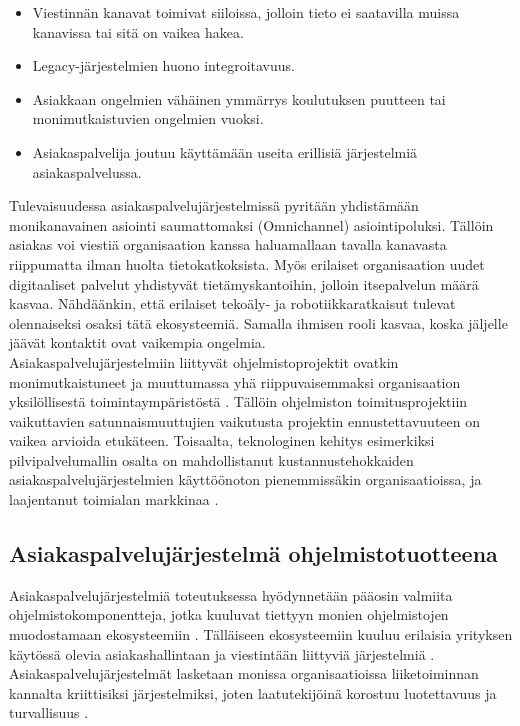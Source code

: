 \documentclass[finnish,12pt,a4paper,pdftex]{article}
\begin{document}
\begin{itemize}
\setlength{\itemsep}{0pt}
    \item Viestinnän kanavat toimivat siiloissa, jolloin tieto ei saatavilla muissa kanavissa tai sitä on vaikea hakea.
    \item Legacy-järjestelmien huono integroitavuus.
    \item Asiakkaan ongelmien vähäinen ymmärrys koulutuksen puutteen tai monimutkaistuvien ongelmien vuoksi.
    \item Asiakaspalvelija joutuu käyttämään useita erillisiä järjestelmiä asiakaspalvelussa. 
\end{itemize}

\noindent Tulevaisuudessa asiakaspalvelujärjestelmissä pyritään yhdistämään monikanavainen asiointi saumattomaksi (Omnichannel) asiointipoluksi. Tällöin asiakas voi viestiä organisaation kanssa haluamallaan tavalla kanavasta riippumatta ilman huolta tietokatkoksista. Myös erilaiset organisaation uudet digitaaliset palvelut yhdistyvät tietämyskantoihin, jolloin itsepalvelun määrä kasvaa. Nähdäänkin, että erilaiset tekoäly- ja robotiikkaratkaisut tulevat olennaiseksi osaksi tätä ekosysteemiä. Samalla ihmisen rooli kasvaa, koska jäljelle jäävät kontaktit ovat vaikempia ongelmia. \citep{ccgartner} \\

\noindent Asiakaspalvelujärjestelmiin liittyvät ohjelmistoprojektit ovatkin monimutkaistuneet ja muuttumassa yhä riippuvaisemmaksi organisaation yksilöllisestä toimintaympäristöstä \citep{ccinfo}. Tällöin ohjelmiston toimitusprojektiin vaikuttavien satunnaismuuttujien vaikutusta projektin ennustettavuuteen on vaikea arvioida etukäteen. Toisaalta, teknologinen kehitys esimerkiksi pilvipalvelumallin osalta on mahdollistanut kustannustehokkaiden asiakaspalvelujärjestelmien käyttöönoton pienemmissäkin organisaatioissa, ja laajentanut toimialan markkinaa \citep{ccgartner}.

\subsection{Asiakaspalvelujärjestelmä ohjelmistotuotteena}

Asiakaspalvelujärjestelmiä toteutuksessa hyödynnetään pääosin valmiita ohjelmistokomponentteja, jotka kuuluvat tiettyyn monien ohjelmistojen muodostamaan ekosysteemiin \citep{ccinfo}. Tälläiseen ekosysteemiin kuuluu erilaisia yrityksen käytössä olevia asiakashallintaan ja viestintään liittyviä järjestelmiä \citep{ccgartner}. Asiakaspalvelujärjestelmät lasketaan monissa organisaatioissa liiketoiminnan kannalta kriittisiksi järjestelmiksi, joten laatutekijöinä korostuu luotettavuus ja turvallisuus \citep{vcc}.  \\
\end{document}
